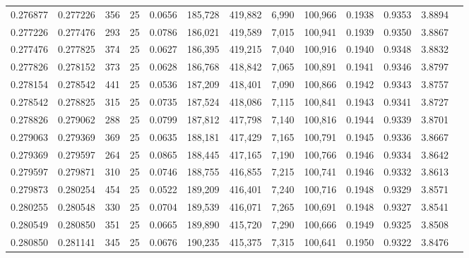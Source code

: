 \begin{tabular}{rrrrrrrrrrrrr}
0.276877 & 0.277226 &   356 &  25 &                                     0.0656 & 185,728 & 419,882 &   6,990 & 100,966 & 0.1938 & 0.9353 & 3.8894 \\
0.277226 & 0.277476 &   293 &  25 &                                     0.0786 & 186,021 & 419,589 &   7,015 & 100,941 & 0.1939 & 0.9350 & 3.8867 \\
0.277476 & 0.277825 &   374 &  25 &                                     0.0627 & 186,395 & 419,215 &   7,040 & 100,916 & 0.1940 & 0.9348 & 3.8832 \\
0.277826 & 0.278152 &   373 &  25 &                                     0.0628 & 186,768 & 418,842 &   7,065 & 100,891 & 0.1941 & 0.9346 & 3.8797 \\
0.278154 & 0.278542 &   441 &  25 &                                     0.0536 & 187,209 & 418,401 &   7,090 & 100,866 & 0.1942 & 0.9343 & 3.8757 \\
0.278542 & 0.278825 &   315 &  25 &                                     0.0735 & 187,524 & 418,086 &   7,115 & 100,841 & 0.1943 & 0.9341 & 3.8727 \\
0.278826 & 0.279062 &   288 &  25 &                                     0.0799 & 187,812 & 417,798 &   7,140 & 100,816 & 0.1944 & 0.9339 & 3.8701 \\
0.279063 & 0.279369 &   369 &  25 &                                     0.0635 & 188,181 & 417,429 &   7,165 & 100,791 & 0.1945 & 0.9336 & 3.8667 \\
0.279369 & 0.279597 &   264 &  25 &                                     0.0865 & 188,445 & 417,165 &   7,190 & 100,766 & 0.1946 & 0.9334 & 3.8642 \\
0.279597 & 0.279871 &   310 &  25 &                                     0.0746 & 188,755 & 416,855 &   7,215 & 100,741 & 0.1946 & 0.9332 & 3.8613 \\
0.279873 & 0.280254 &   454 &  25 &                                     0.0522 & 189,209 & 416,401 &   7,240 & 100,716 & 0.1948 & 0.9329 & 3.8571 \\
0.280255 & 0.280548 &   330 &  25 &                                     0.0704 & 189,539 & 416,071 &   7,265 & 100,691 & 0.1948 & 0.9327 & 3.8541 \\
0.280549 & 0.280850 &   351 &  25 &                                     0.0665 & 189,890 & 415,720 &   7,290 & 100,666 & 0.1949 & 0.9325 & 3.8508 \\
0.280850 & 0.281141 &   345 &  25 &                                     0.0676 & 190,235 & 415,375 &   7,315 & 100,641 & 0.1950 & 0.9322 & 3.8476 \\

\end{tabular}
